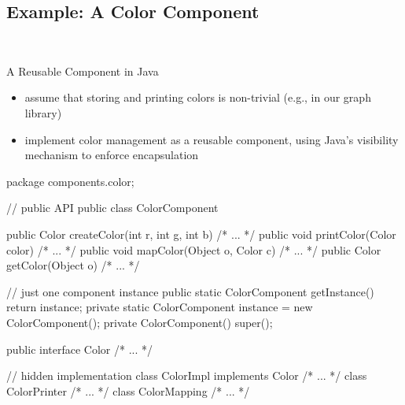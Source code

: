 \subsection[Example Component]{Example: A Color Component}
\begin{frame}[fragile]{\myframetitle\ \mytitlesource{\fospl}}
	\begin{mycolumns}[widths={40}]
			\begin{example}{A Reusable Component in Java}
				\begin{itemize}
					\item assume that storing and printing colors is non-trivial (e.g., in our graph library)
					\item implement color management as a reusable component, using Java's visibility mechanism to enforce encapsulation
				\end{itemize}
			\end{example}
		\mynextcolumn
\begin{codetight}{}
package components.color;

// public API
public class ColorComponent {
	public Color createColor(int r, int g, int b) { /* ... */ }
	public void printColor(Color color) { /* ... */ }
	public void mapColor(Object o, Color c) { /* ... */ }
	public Color getColor(Object o) { /* ... */ }
	
	// just one component instance
	public static ColorComponent getInstance() { return instance; }
	private static ColorComponent instance = new ColorComponent();
	private ColorComponent() { super(); }
}
public interface Color { /* ... */ }

// hidden implementation
class ColorImpl implements Color { /* ... */ }
class ColorPrinter { /* ... */ }
class ColorMapping { /* ... */ }
\end{codetight}
	\end{mycolumns}
\end{frame}

